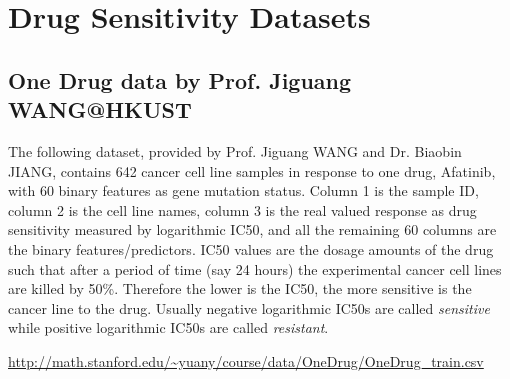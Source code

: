 \documentclass[11pt]{article}
\begin{document}
%
%
% 
%
%
%
%
%
%

\section{Drug Sensitivity Datasets}

\subsection{One Drug data by Prof. Jiguang WANG@HKUST}
The following dataset, provided by Prof. Jiguang WANG and Dr. Biaobin JIANG, contains 642 cancer cell line samples in response to one drug, Afatinib, with 60 binary features as gene mutation status. Column 1 is the sample ID, column 2 is the cell line names, column 3 is the real valued response as drug sensitivity measured by logarithmic IC50, and all the remaining 60 columns are the binary features/predictors. IC50 values are the dosage amounts of the drug such that after a period of time (say 24 hours) the experimental cancer cell lines are killed by 50\%. Therefore the lower is the IC50, the more sensitive is the cancer line to the drug. Usually negative logarithmic IC50s are called \emph{sensitive} while positive logarithmic IC50s are called \emph{resistant}.
\begin{center}
\url{http://math.stanford.edu/~yuany/course/data/OneDrug/OneDrug_train.csv}
\end{center}
\end{document}
